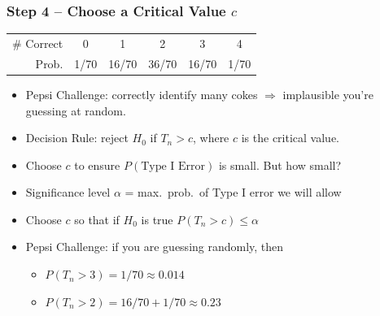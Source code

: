 \begin{frame}
  \frametitle{Step 4 -- Choose a Critical Value $c$}

    \small
            \begin{center}
              \begin{tabular}{rccccc}
                \hline
                \# Correct & 0 & 1 & 2 & 3 & 4\\
                Prob.&1/70 & 16/70 & 36/70 & 16/70 &1/70\\
                \hline
              \end{tabular}
            \end{center}

      \begin{itemize}
      \item Pepsi Challenge: correctly identify many cokes $\Rightarrow$ implausible you're guessing at random. \pause
        \item Decision Rule: reject $H_0$ if $T_n > c$, where \alert{$c$ is the critical value}. \pause
        \item Choose $c$ to ensure $P(\text{Type I Error})$ is small. But how small? \pause
        \item \alert{Significance level $\alpha$} = max.\ prob.\ of Type I error we will allow \pause
      \item Choose $c$ so that if $H_0$ is true $P(T_n > c) \leq \alpha$ \pause 
    \item Pepsi Challenge: if you are guessing randomly, then
        \begin{itemize}
          \item $P(T_n > 3) = 1/70 \approx 0.014$
          \item $P(T_n > 2) = 16/70 + 1/70 \approx 0.23$
        \end{itemize}
      \end{itemize}

\end{frame}
